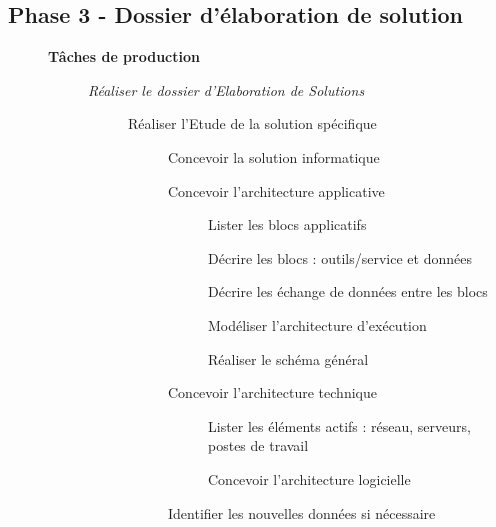 \subsection{Phase 3 - Dossier d'élaboration de solution}

\begin{description}
    \item[] \bf{Tâches de production}
        \begin{description}
            \item[\textbullet] \it{Réaliser le dossier d'Elaboration de Solutions}
                \begin{description}
                    \item[\textbullet] Réaliser l'Etude de la solution spécifique
                        \begin{description}
                            \item[\textbullet] Concevoir la solution informatique
                            \item[\textbullet] Concevoir l’architecture applicative
                                \begin{description}
                                    \item[\textbullet] Lister les blocs applicatifs
                                    \item[\textbullet] Décrire les blocs : outils/service et données
                                    \item[\textbullet] Décrire les échange de données entre les blocs
                                    \item[\textbullet] Modéliser l’architecture d’exécution
                                    \item[\textbullet] Réaliser le schéma général
                                \end{description}
                    \item[\textbullet] Concevoir l’architecture technique
                        \begin{description}
                            \item[\textbullet] Lister les éléments actifs : réseau, serveurs, postes de travail
                            \item[\textbullet] Concevoir l’architecture logicielle
                        \end{description}
                    \item[\textbullet] Identifier les nouvelles données si nécessaire

\end{description}
\end{description}
\end{description}
\end{description}
